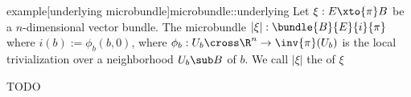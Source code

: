 \begin{mystatement}{example}[underlying microbundle]{microbundle::underlying}
    Let $\xi: E \xto{\pi} B$ be a $n$-dimensional vector bundle.
    The microbundle $\lvert \xi \rvert: \bundle{B}{E}{i}{\pi}$ where $i(b) := \phi_b(b, 0)$, where
    $\phi_b: U_b \cross \R^n \to \inv{\pi}(U_b)$ is the local trivialization over a
    neighborhood $U_b \sub B$ of $b$. We call $\lvert \xi \rvert$ the  of $\xi$
\end{mystatement}

\begin{myproof}
    TODO
\end{myproof}